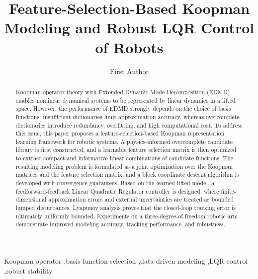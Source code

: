 \documentclass[final,3p,twocolumn,times]{elsarticle}
\begin{document}
\begin{frontmatter}

\title{Feature-Selection-Based Koopman Modeling and Robust LQR Control of Robots}

\author[inst1]{First Author}


\begin{abstract}
Koopman operator theory with Extended Dynamic Mode Decomposition (EDMD) enables nonlinear dynamical systems to be represented by linear dynamics in a lifted space. However, the performance of EDMD strongly depends on the choice of basis functions: insufficient dictionaries limit approximation accuracy, whereas overcomplete dictionaries introduce redundancy, overfitting, and high computational cost. To address this issue, this paper proposes a feature-selection-based Koopman representation learning framework for robotic systems. A physics-informed overcomplete candidate library is first constructed, and a learnable feature selection matrix is then optimized to extract compact and informative linear combinations of candidate functions. The resulting modeling problem is formulated as a joint optimization over the Koopman matrices and the feature selection matrix, and a block coordinate descent algorithm is developed with convergence guarantees. Based on the learned lifted model, a feedforward-feedback Linear Quadratic Regulator controller is designed, where finite-dimensional approximation errors and external uncertainties are treated as bounded lumped disturbances. Lyapunov analysis proves that the closed-loop tracking error is ultimately uniformly bounded. Experiments on a three-degree-of-freedom robotic arm demonstrate improved modeling accuracy, tracking performance, and robustness.
\end{abstract}

\begin{keyword}
Koopman operator \sep basis function selection \sep data-driven modeling \sep LQR control \sep robust stability
\end{keyword}

\end{frontmatter}

\end{document}
